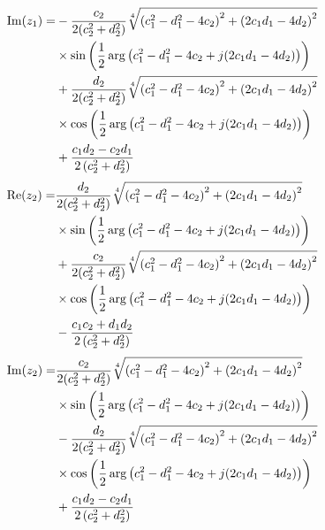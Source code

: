 \begin{align}
{\mathop{\rm Im}\nolimits} ({z_1}) =&  - \frac{{{c_2}}}{{2(c_2^2 + d_2^2)}}\sqrt[4]{{{{\left( {c_1^2 - d_1^2 - 4{c_2}} \right)}^2} + {{\left( {2{c_1}{d_1} - 4{d_2}} \right)}^2}}} \notag \\
& \times \sin \left( {\frac{1}{2}\arg \left( {c_1^2 - d_1^2 - 4{c_2} + j(2{c_1}{d_1} - 4{d_2})} \right)} \right) \notag \\
& + \frac{{{d_2}}}{{2(c_2^2 + d_2^2)}}\sqrt[4]{{{{\left( {c_1^2 - d_1^2 - 4{c_2}} \right)}^2} + {{\left( {2{c_1}{d_1} - 4{d_2}} \right)}^2}}} \notag \\
& \times \cos \left( {\frac{1}{2}\arg \left( {c_1^2 - d_1^2 - 4{c_2} + j(2{c_1}{d_1} - 4{d_2})} \right)} \right) \notag \\
& + \frac{{{c_1}{d_2} - {c_2}{d_1}}}{{2\left( {c_2^2 + d_2^2} \right)}}  \label{eq:e8}
\end{align}
\begin{align}
{\mathop{\rm Re}\nolimits} ({z_2}) =&   \frac{{{d_2}}}{{2(c_2^2 + d_2^2)}}\sqrt[4]{{{{\left( {c_1^2 - d_1^2 - 4{c_2}} \right)}^2} + {{\left( {2{c_1}{d_1} - 4{d_2}} \right)}^2}}} \notag \\
& \times \sin \left( {\frac{1}{2}\arg \left( {c_1^2 - d_1^2 - 4{c_2} + j(2{c_1}{d_1} - 4{d_2})} \right)} \right) \notag \\
& + \frac{{{c_2}}}{{2(c_2^2 + d_2^2)}}\sqrt[4]{{{{\left( {c_1^2 - d_1^2 - 4{c_2}} \right)}^2} + {{\left( {2{c_1}{d_1} - 4{d_2}} \right)}^2}}} \notag \\
& \times \cos \left( {\frac{1}{2}\arg \left( {c_1^2 - d_1^2 - 4{c_2} + j(2{c_1}{d_1} - 4{d_2})} \right)} \right) \notag \\
& - \frac{{{c_1}{c_2} + {d_1}{d_2}}}{{2\left( {c_2^2 + d_2^2} \right)}}  \label{eq:e9}
\end{align}
\begin{align}
{\mathop{\rm Im}\nolimits} ({z_2}) =&   \frac{{{c_2}}}{{2(c_2^2 + d_2^2)}}\sqrt[4]{{{{\left( {c_1^2 - d_1^2 - 4{c_2}} \right)}^2} + {{\left( {2{c_1}{d_1} - 4{d_2}} \right)}^2}}} \notag \\
& \times \sin \left( {\frac{1}{2}\arg \left( {c_1^2 - d_1^2 - 4{c_2} + j(2{c_1}{d_1} - 4{d_2})} \right)} \right) \notag \\
& - \frac{{{d_2}}}{{2(c_2^2 + d_2^2)}}\sqrt[4]{{{{\left( {c_1^2 - d_1^2 - 4{c_2}} \right)}^2} + {{\left( {2{c_1}{d_1} - 4{d_2}} \right)}^2}}} \notag \\
& \times \cos \left( {\frac{1}{2}\arg \left( {c_1^2 - d_1^2 - 4{c_2} + j(2{c_1}{d_1} - 4{d_2})} \right)} \right) \notag \\
& + \frac{{{c_1}{d_2} - {c_2}{d_1}}}{{2\left( {c_2^2 + d_2^2} \right)}}  \label{eq:e10}
\end{align}
